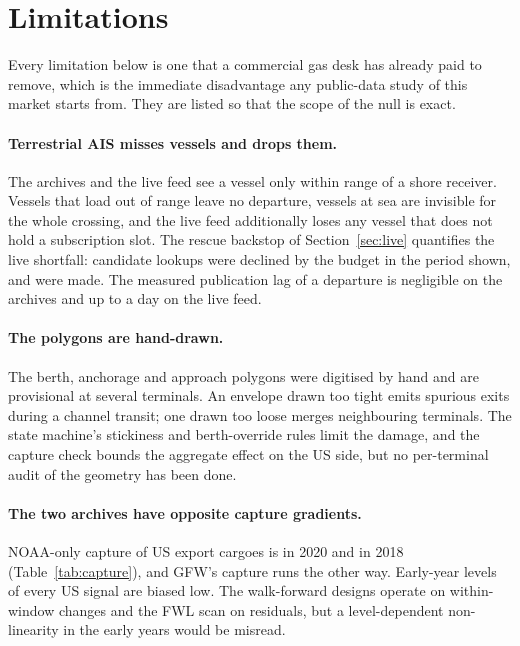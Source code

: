 \section{Limitations}\label{sec:limitations}

Every limitation below is one that a commercial gas desk has already paid to
remove, which is the immediate disadvantage any public-data study of this market
starts from. They are listed so that the scope of the null is exact.

\paragraph{Terrestrial AIS misses vessels and drops them.} The archives and the
live feed see a vessel only within range of a shore receiver. Vessels that load out
of range leave no departure, vessels at sea are invisible for the whole crossing,
and the live feed additionally loses any vessel that does not hold a subscription
slot. The rescue backstop of Section~\ref{sec:live} quantifies the live shortfall:
\nRescueSkipped{} candidate lookups were declined by the budget in the period
shown, and \nRescueLookups{} were made. The measured publication lag of a
departure is negligible on the archives and up to a day on the live feed.

\paragraph{The polygons are hand-drawn.} The \nZonePolygons{} berth, anchorage and
approach polygons were digitised by hand and are provisional at several terminals.
An envelope drawn too tight emits spurious exits during a channel transit; one
drawn too loose merges neighbouring terminals. The state machine's stickiness and
berth-override rules limit the damage, and the capture check bounds the aggregate
effect on the US side, but no per-terminal audit of the geometry has been done.

\paragraph{The two archives have opposite capture gradients.} NOAA-only capture of
US export cargoes is \captureTwentyTwenty{} in 2020 and \captureTwentyEighteen{} in
2018 (Table~\ref{tab:capture}), and GFW's capture runs the other way. Early-year
levels of every US signal are biased low. The walk-forward designs operate on
within-window changes and the FWL scan on residuals, but a level-dependent
non-linearity in the early years would be misread.

